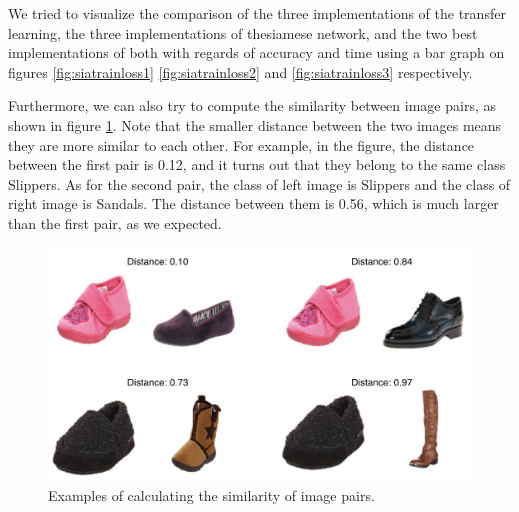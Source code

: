 We tried to visualize the comparison of the three implementations of the transfer learning, the three implementations of thesiamese network, and the  two best implementations of both with regards of accuracy and time using a bar graph on figures \ref{fig:siatrainloss1} \ref{fig:siatrainloss2} and \ref{fig:siatrainloss3} respectively.

Furthermore, we can also try to compute the similarity between image pairs, as shown in figure \ref{fig:similarity}. Note that the smaller distance between the two images means they are more similar to each other. For example, in the figure, the distance between the first pair is 0.12, and it turns out that they belong to the same class Slippers. As for the second pair, the class of left image is Slippers and the class of right image is Sandals. The distance between them is 0.56, which is much larger than the first pair, as we expected. 

\begin{figure}[h]
  \centering
  \includegraphics[width=\linewidth]{figs/similarity.png}
  \caption{Examples of calculating the similarity of image pairs.}
  \label{fig:similarity}
\end{figure}


